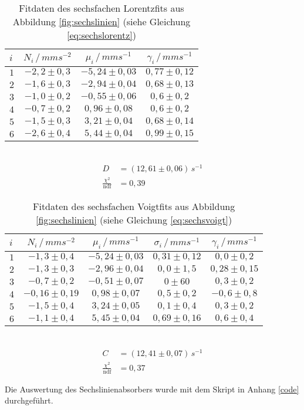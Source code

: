 \begin{table}[h!]
	\centering
	\begin{tabular}{l|ccc}
		$i$&$N_i\,/\,\si{mms^{-2}}$&$\mu_i\,/\,\si{mms^{-1}}$&$\gamma_i\,/\,\si{mms^{-1}}$\\\hline
		$1$&$-2,2\pm0,3$&$-5,24\pm0,03$&$0,77\pm0,12$\\
		$2$&$-1,6\pm0,3$&$-2,94\pm0,04$&$0,68\pm0,13$\\
		$3$&$-1,0\pm0,2$&$-0,55\pm0,06$&$0,6 \pm0,2$\\
		$4$&$-0,7\pm0,2$&$ 0,96\pm0,08$&$0,6 \pm0,2$\\
		$5$&$-1,5\pm0,3$&$ 3,21\pm0,04$&$0,68\pm0,14$\\
		$6$&$-2,6\pm0,4$&$ 5,44\pm0,04$&$0,99\pm0,15$\\
	\end{tabular}\\
	\begin{align*}
	D&=(12,61\pm0,06)\,\si{s^{-1}}\\
	\frac{\chi^2}{\mathrm{ndf}}&=0,39
	\end{align*}
	\caption[Fitdaten des sechsfachen Lorentzfits]{Fitdaten des sechsfachen Lorentzfits aus Abbildung \ref{fig:sechslinien} (siehe Gleichung \ref{eq:sechslorentz})}
	\label{tab:sechslorentz}
\end{table}

\begin{table}[h!]
	\centering
	\begin{tabular}{l|cccc}
		$i$&$N_i\,/\,\si{mms^{-2}}$&$\mu_i\,/\,\si{mms^{-1}}$&$\sigma_i\,/\,\si{mms^{-1}}$&$\gamma_i\,/\,\si{mms^{-1}}$\\\hline
		$1$&$-1,3\pm0,4$&$-5,24\pm0,03$&$0,31 \pm0,12$&$0,0 \pm0,2$\\
		$2$&$-1,3\pm0,3$&$-2,96\pm0,04$&$0,0  \pm1,5$ &$0,28\pm0,15$\\
		$3$&$-0,7\pm0,2$&$-0,51\pm0,07$&$0    \pm60$  &$0,3 \pm0,2$\\
		$4$&$-0,16\pm0,19$&$ 0,98\pm0,07$&$0,5\pm0,2$ &$-0,6\pm0,8$\\
		$5$&$-1,5\pm0,4$&$ 3,24\pm0,05$&$0,1  \pm0,4$ &$0,3 \pm0,2$\\
		$6$&$-1,1\pm0,4$&$ 5,45\pm0,04$&$0,69 \pm0,16$&$0,6\pm0,4$\\
	\end{tabular}\\
	\begin{align*}
		C&=(12,41\pm0,07)\,\si{s^{-1}}\\
		\frac{\chi^2}{\mathrm{ndf}}&=0,37
	\end{align*}
	\caption[Fitdaten des sechsfachen Voigtfits]{Fitdaten des sechsfachen Voigtfits aus Abbildung \ref{fig:sechslinien} (siehe Gleichung \ref{eq:sechsvoigt})}
	\label{tab:sechsvoigt}
\end{table}
Die Auswertung des Sechslinienabsorbers wurde mit dem Skript  in Anhang \ref{code} durchgeführt.
\clearpage
